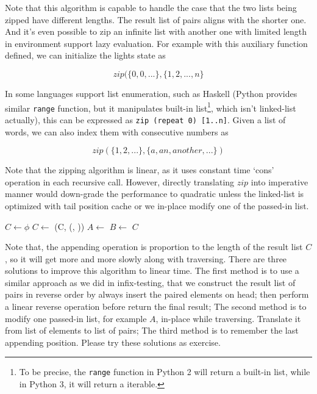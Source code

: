 \documentclass[b5paper]{article}
\begin{document}
Note that this algorithm is capable to handle the case that the two lists being zipped have different
lengths. The result list of pairs aligns with the shorter one. And it's even possible to zip
an infinite list with another one with limited length in environment support lazy evaluation.
For example with this auxiliary function defined,
we can initialize the lights state as

\[
zip(\{0, 0, ...\}, \{1, 2, ..., n\}
\]

In some languages support list enumeration, such as Haskell (Python provides similar \texttt{range} function, but it
manipulates built-in list\footnote{To be precise, the \texttt{range} function in Python 2 will return a built-in list,
while in Python 3, it will return a iterable.}, which isn't linked-list actually), this can be expressed as \texttt{zip (repeat 0) [1..n]}.
Given a list of words, we can also index them with consecutive numbers as

\[
zip(\{1, 2, ...\}, \{a, an, another, ...\})
\]

Note that the zipping algorithm is linear, as it uses constant time `cons' operation in each recursive call.
However, directly translating $zip$ into imperative manner would down-grade the performance to quadratic
unless the linked-list is optimized with tail position cache or we in-place modify one of the passed-in list.

\begin{algorithmic}[1]
  \State $C \gets \phi$
    \State $C \gets $ (C, (, ))
    \State $A \gets$ 
    \State $B \gets$ 
  \EndWhile
  \State \Return $C$
\EndFunction
\end{algorithmic}

Note that, the appending operation is proportion to the length of the result list $C$, so it will get
more and more slowly along with traversing. There are three solutions to improve this algorithm to
linear time. The first method is to use a similar approach as we did in infix-testing, that we construct
the result list of pairs in reverse order by always insert the paired elements on head; then perform
a linear reverse operation before return the final result; The second method is to modify one passed-in
list, for example $A$, in-place while traversing. Translate it from list of elements to list of pairs;
The third method is to remember the last appending position. Please try these solutions as exercise.
\end{document}

